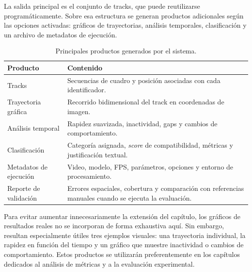 La salida principal es el conjunto de tracks, que puede reutilizarse programáticamente. Sobre esa estructura se generan productos adicionales según las opciones activadas: gráficos de trayectorias, análisis temporales, clasificación y un archivo de metadatos de ejecución.

\begin{table}[H]
  \centering
  \footnotesize
  \setlength{\tabcolsep}{5pt}
  \renewcommand{\arraystretch}{1.12}
  \caption{Principales productos generados por el sistema.}
  \label{tab:salidas-sistema}
  \begin{tabularx}{0.94\textwidth}{@{}p{}X@{}}
    \toprule
    \textbf{Producto} & \textbf{Contenido} \\
    \midrule
    Tracks & Secuencias de cuadro y posición asociadas con cada identificador. \\
    Trayectoria gráfica & Recorrido bidimensional del track en coordenadas de imagen. \\
    Análisis temporal & Rapidez suavizada, inactividad, gaps y cambios de comportamiento. \\
    Clasificación & Categoría asignada, \textit{score} de compatibilidad, métricas y justificación textual. \\
    Metadatos de ejecución & Video, modelo, FPS, parámetros, opciones y entorno de procesamiento. \\
    Reporte de validación & Errores espaciales, cobertura y comparación con referencias manuales cuando se ejecuta la evaluación. \\
    \bottomrule
  \end{tabularx}
\end{table}

Para evitar aumentar innecesariamente la extensión del capítulo, los gráficos de resultados reales no se incorporan de forma exhaustiva aquí. Sin embargo, resultan especialmente útiles tres ejemplos visuales: una trayectoria individual, la rapidez en función del tiempo y un gráfico que muestre inactividad o cambios de comportamiento. Estos productos se utilizarán preferentemente en los capítulos dedicados al análisis de métricas y a la evaluación experimental.

%

